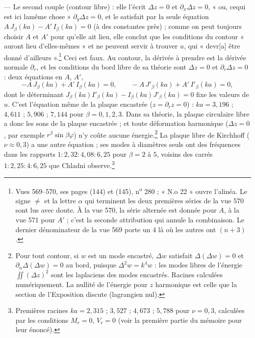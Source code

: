\documentclass[11pt,a4paper]{article}
\begin{document}
— Le second couple (contour libre) : elle l'écrit $\Delta z = 0$ et
$\partial_x \Delta z = 0$, « ou, cequi est ici lamême chose » $\partial_y\Delta z
= 0$, et le satisfait par la seule équation
$A\,J_\beta(ka) - A'\,I_\beta(ka) = 0$ (à des constantes près) ; comme on peut
toujours choisir $A$ et $A'$ pour qu'elle ait lieu, elle conclut que les
conditions du contour « auront lieu d'elles-mêmes » et ne peuvent servir à
trouver $u$, qui « devr[a] être donné d'ailleurs ».\footnote{Vues 569--570, ses
pages (144) et (145), n\textsuperscript{o} 280 ; « N.o 22 » ouvre l'alinéa. Le signe
$\neq$ et la lettre $\alpha$ qui terminent les deux premières séries de la vue
570 sont lus avec doute. À la vue 570, la série alternée est donnée pour $A$, à
la vue 571 pour $A'$ ; c'est la seconde attribution qui annule la combinaison.
Le dernier dénominateur de la vue 569 porte un 4 là où les autres ont $(n+3)$.}
Ceci est faux. Au contour, la dérivée à prendre est la dérivée normale
$\partial_r$, et les conditions du bord libre de sa théorie sont $\Delta z = 0$
et $\partial_r\Delta z = 0$ : deux équations en $A$, $A'$,
\[
-A\,J_\beta(ka) + A'\,I_\beta(ka) = 0, \qquad -A\,J'_\beta(ka) + A'\,I'_\beta(ka) = 0,
\]
dont le déterminant $J_\beta(ka)I'_\beta(ka) - I_\beta(ka)J'_\beta(ka) = 0$ fixe
les valeurs de $u$. C'est l'équation même de la plaque encastrée
($z = \partial_r z = 0$) : $ka = 3{,}196$ ; $4{,}611$ ; $5{,}906$ ; $7{,}144$ pour
$\beta = 0, 1, 2, 3$. Dans sa théorie, la plaque circulaire libre a donc les sons
de la plaque encastrée ; et toute déformation harmonique ($\Delta z = 0$, par
exemple $r^\beta\sin\beta\varphi$) n'y coûte aucune énergie.\footnote{Pour tout
contour, si $w$ est un mode encastré, $\Delta w$ satisfait $\Delta(\Delta w) = 0$
et $\partial_n\Delta(\Delta w) = 0$ au bord, puisque $\Delta^2 w = k^4 w$ : les
modes libres de l'énergie $\iint(\Delta z)^2$ sont les laplaciens des modes
encastrés. Racines calculées numériquement. La nullité de l'énergie pour
$z$ harmonique est celle que la section de l'Exposition discute (lagrangien
nul).} La plaque libre de Kirchhoff ($\nu\approx0{,}3$) a une autre équation ;
ses modes à diamètres seuls ont des fréquences dans les rapports
$1 : 2{,}32 : 4{,}08 : 6{,}25$ pour $\beta = 2$ à $5$, voisins des carrés
$1 : 2{,}25 : 4 : 6{,}25$ que Chladni observe.\footnote{Premières racines
$ka = 2{,}315$ ; $3{,}527$ ; $4{,}673$ ; $5{,}788$ pour $\nu = 0{,}3$, calculées
par les conditions $M_r = 0$, $V_r = 0$ (voir la première partie du mémoire pour
leur énoncé).}
\end{document}
